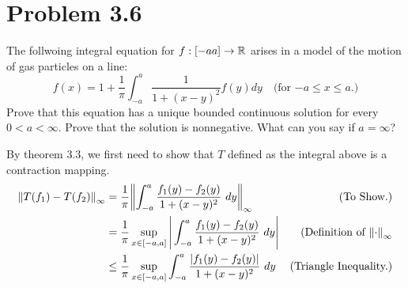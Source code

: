 \section{Problem 3.6}
The follwoing integral equation for $f: [-a a] \rightarrow \mathbb{R}$ arises in a model of the motion of gas particles on a line:
\[f(x) = 1 + \frac{1}{\pi} \int_{-a}^a \frac{1}{1 + (x - y)^2}f(y)dy \quad \text{(for $-a \leq x \leq a.$)}\]
Prove that this equation has a unique bounded continuous solution for every $0 < a < \infty$. Prove that the solution is nonnegative. What can you say if $a = \infty$?
\partbreak
\begin{solution}

    By theorem 3.3, we first need to show that $T$ defined as the integral above is a contraction mapping.
    \tightalignbreak
    \begin{align*}
        \norm{T(f_1) - T(f_2)}_\infty &= \frac{1}{\pi}\norm{\int_{-a}^a \frac{f_1(y) - f_2(y)}{1 + (x - y)^2}\ dy}_\infty &\text{(To Show.)}\\
        &= \frac{1}{\pi}\sup_{x \in [-a, a]} \Bigg|\int_{-a}^a \frac{f_1(y) - f_2(y)}{1 + (x - y)^2}\ dy \Bigg| &\text{(Definition of $\norm{\cdot}_\infty$}\\
        &\leq \frac{1}{\pi}\sup_{x \in [-a, a]} \int_{-a}^a \frac{|f_1(y) - f_2(y)|}{1 + (x - y)^2}\ dy &\text{(Triangle Inequality.)}\\
    \end{align*}
\end{solution}
